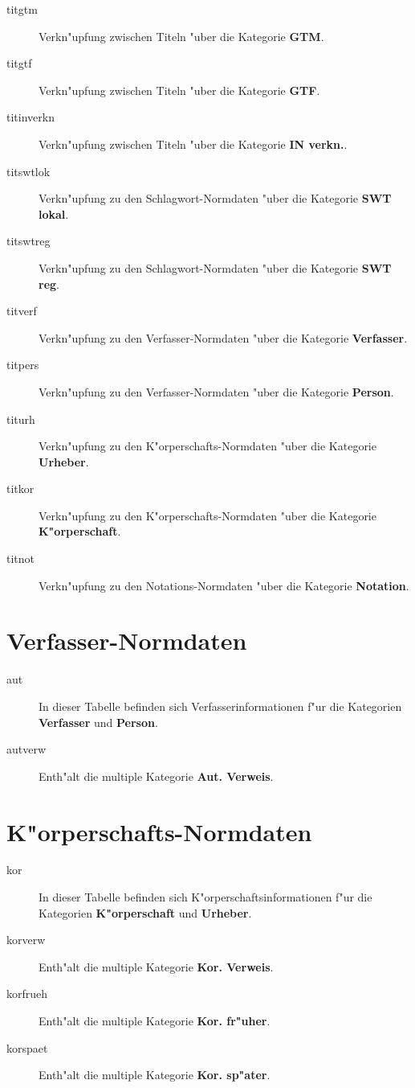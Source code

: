 \documentclass[11pt, twoside, a4paper, BCOR8mm, DIV12, bibtotoc,idxtotoc]{scrbook}
\begin{document}
\begin{description}
\item[titgtm] Verkn"upfung zwischen Titeln "uber die Kategorie
  \textbf{GTM}.
\item[titgtf] Verkn"upfung zwischen Titeln "uber die Kategorie
  \textbf{GTF}.
\item[titinverkn] Verkn"upfung zwischen Titeln "uber die Kategorie
  \textbf{IN verkn.}.
\item[titswtlok] Verkn"upfung zu den Schlagwort-Normdaten "uber die
  Kategorie \textbf{SWT lokal}.
\item[titswtreg] Verkn"upfung zu den Schlagwort-Normdaten "uber die
  Kategorie \textbf{SWT reg}.
\item[titverf] Verkn"upfung zu den Verfasser-Normdaten "uber die
  Kategorie \textbf{Verfasser}.
\item[titpers] Verkn"upfung zu den Verfasser-Normdaten "uber die
  Kategorie \textbf{Person}.
\item[titurh] Verkn"upfung zu den K"orperschafts-Normdaten "uber die
  Kategorie \textbf{Urheber}.
\item[titkor] Verkn"upfung zu den K"orperschafts-Normdaten "uber die
  Kategorie \textbf{K"orperschaft}.
\item[titnot] Verkn"upfung zu den Notations-Normdaten "uber die Kategorie
  \textbf{Notation}.
\end{description}

\section{Verfasser-Normdaten}

\begin{description}
\item[aut] In dieser Tabelle befinden sich Verfasserinformationen f"ur
  die Kategorien \textbf{Verfasser} und \textbf{Person}.
\item[autverw] Enth"alt die multiple Kategorie \textbf{Aut. Verweis}.
\end{description}


\section{K"orperschafts-Normdaten}

\begin{description}
\item[kor] In dieser Tabelle befinden sich K"orperschaftsinformationen f"ur
  die Kategorien \textbf{K"orperschaft} und \textbf{Urheber}.
\item[korverw] Enth"alt die multiple Kategorie \textbf{Kor. Verweis}.
\item[korfrueh] Enth"alt die multiple Kategorie \textbf{Kor. fr"uher}.
\item[korspaet] Enth"alt die multiple Kategorie \textbf{Kor. sp"ater}.
\end{description}
\end{document}
